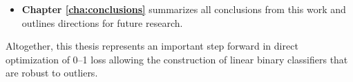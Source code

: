 \begin{itemize}
\item {\bf Chapter \ref{cha:conclusions}} summarizes all conclusions from this work and outlines directions for future research.

\end{itemize}

Altogether, this thesis represents an important step forward in direct optimization of 0--1 loss allowing the construction of linear binary classifiers that are robust to outliers.




